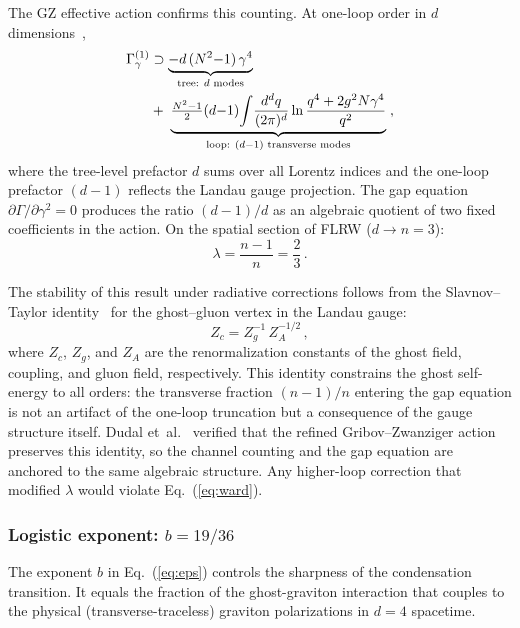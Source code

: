 \documentclass[a4paper,fleqn]{cas-dc}
\begin{document}
The GZ effective action confirms this counting. At one-loop order in
$d$ dimensions~\cite{vandersickel2012},
\begin{align}
\Gamma^{(1)}_\gamma &\supset
  \underbrace{-d\,(N^2{-}1)\,\gamma^4}_{\text{tree: }
    d\text{ modes}}
  \notag \\
  &+\;\underbrace{\tfrac{N^2{-}1}{2}(d{-}1)\!\int\!
    \frac{d^dq}{(2\pi)^d}
    \ln\frac{q^4 + 2g^2 N\gamma^4}{q^2}}_{\text{loop: }
    (d{-}1)\text{ transverse modes}}\;,
\label{eq:gz_action}
\end{align}
where the tree-level prefactor $d$ sums over all Lorentz indices and
the one-loop prefactor $(d{-}1)$ reflects the Landau gauge projection.
The gap equation $\partial\Gamma/\partial\gamma^2 = 0$ produces the
ratio $(d{-}1)/d$ as an algebraic quotient of two fixed coefficients
in the action. On the spatial section of FLRW ($d \to n = 3$):
\begin{equation}
\boxed{\lambda = \frac{n-1}{n} = \frac{2}{3}\,.}
\label{eq:lambda}
\end{equation}

The stability of this result under radiative corrections
follows from the Slavnov--Taylor
identity~\cite{taylor1971} for the ghost--gluon vertex in
the Landau gauge:
\begin{equation}
Z_c = Z_g^{-1}\,Z_A^{-1/2}\,,
\label{eq:ward}
\end{equation}
where $Z_c$, $Z_g$, and $Z_A$ are the renormalization
constants of the ghost field, coupling, and gluon field,
respectively. This identity constrains the ghost
self-energy to all orders: the transverse fraction
$(n{-}1)/n$ entering the gap equation is not an
artifact of the one-loop truncation but a consequence
of the gauge structure itself. Dudal
et~al.~\cite{dudal2008} verified that the refined
Gribov--Zwanziger action preserves this identity, so
the channel counting and the gap equation are anchored
to the same algebraic structure. Any higher-loop
correction that modified $\lambda$ would violate
Eq.~(\ref{eq:ward}).

\subsubsection{Logistic exponent: $b = 19/36$}
\label{sec:b}

The exponent $b$ in Eq.~(\ref{eq:eps}) controls the sharpness of the
condensation transition. It equals the fraction of the ghost-graviton
interaction that couples to the physical (transverse-traceless)
graviton polarizations in $d = 4$ spacetime.
\end{document}
